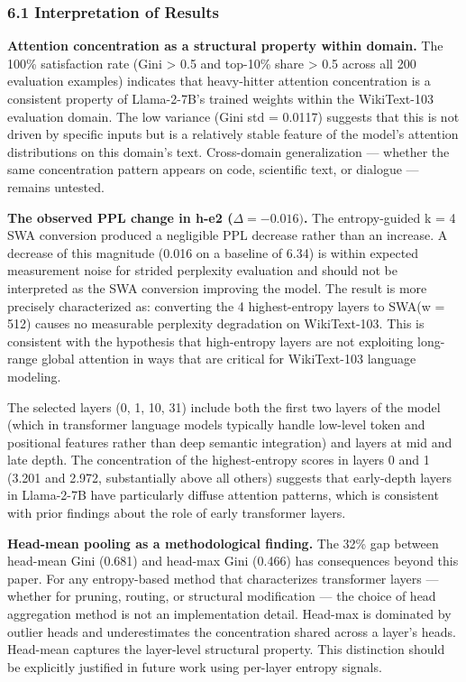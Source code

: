 
\subsubsection{6.1 Interpretation of Results}

\textbf{Attention concentration as a structural property within domain.} The 100\% satisfaction rate (Gini > 0.5 and top-10\% share > 0.5 across all 200 evaluation examples) indicates that heavy-hitter attention concentration is a consistent property of Llama-2-7B's trained weights within the WikiText-103 evaluation domain. The low variance (Gini std = 0.0117) suggests that this is not driven by specific inputs but is a relatively stable feature of the model's attention distributions on this domain's text. Cross-domain generalization --- whether the same concentration pattern appears on code, scientific text, or dialogue --- remains untested.

\textbf{The observed PPL change in h-e2 ($\Delta = -0.016)$.} The entropy-guided k = 4 SWA conversion produced a negligible PPL decrease rather than an increase. A decrease of this magnitude (0.016 on a baseline of 6.34) is within expected measurement noise for strided perplexity evaluation and should not be interpreted as the SWA conversion improving the model. The result is more precisely characterized as: converting the 4 highest-entropy layers to SWA(w = 512) causes no measurable perplexity degradation on WikiText-103. This is consistent with the hypothesis that high-entropy layers are not exploiting long-range global attention in ways that are critical for WikiText-103 language modeling.

The selected layers (0, 1, 10, 31) include both the first two layers of the model (which in transformer language models typically handle low-level token and positional features rather than deep semantic integration) and layers at mid and late depth. The concentration of the highest-entropy scores in layers 0 and 1 (3.201 and 2.972, substantially above all others) suggests that early-depth layers in Llama-2-7B have particularly diffuse attention patterns, which is consistent with prior findings about the role of early transformer layers.

\textbf{Head-mean pooling as a methodological finding.} The 32\% gap between head-mean Gini (0.681) and head-max Gini (0.466) has consequences beyond this paper. For any entropy-based method that characterizes transformer layers --- whether for pruning, routing, or structural modification --- the choice of head aggregation method is not an implementation detail. Head-max is dominated by outlier heads and underestimates the concentration shared across a layer's heads. Head-mean captures the layer-level structural property. This distinction should be explicitly justified in future work using per-layer entropy signals.

